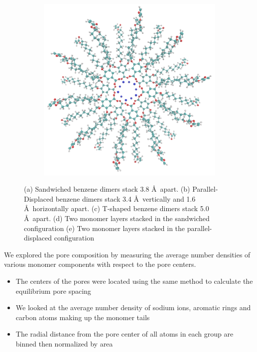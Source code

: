 \documentclass{article}
\newcommand{\angstrom}{\textup{\AA}}
\begin{document}
\begin{figure}
\begin{subfigure}[b]{0.475\textwidth}
		\caption{}\label{fig:sandwichedlayers}
	\end{subfigure}
	\begin{subfigure}[b]{0.475\textwidth}
		\centering
		\includegraphics[width=\textwidth]{offsetlayers.png}
		\caption{}\label{fig:offsetlayers}
	\end{subfigure}
	\caption{(a) Sandwiched benzene dimers stack 3.8 \angstrom~apart. (b) Parallel-Displaced benzene dimers stack
	3.4 \angstrom~vertically and 1.6 \angstrom~horizontally apart. (c) T-shaped benzene dimers stack 5.0 \angstrom~apart. 
	(d) Two monomer layers stacked in the sandwiched configuration (e) Two monomer layers stacked in the parallel-displaced
	configuration }\label{fig:stacking}
  \end{figure}
  
  We explored the pore composition by measuring the average number densities of
  various monomer components with respect to the pore centers.
  \begin{itemize}
	\item The centers of the pores were located using the same method to
        calculate the equilibrium pore spacing
        \item We looked at the average number density of sodium ions, aromatic
	rings and carbon atoms making up the monomer tails 
	\item The radial distance from the pore center of all atoms in each group
        are binned then normalized by area 
  \end{itemize}
\end{document}
